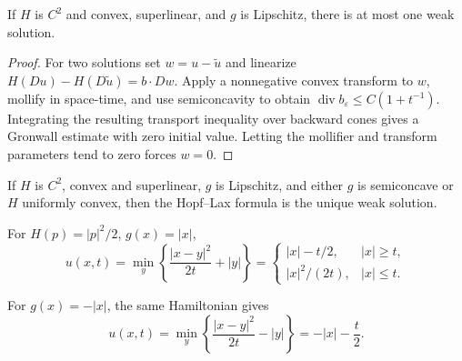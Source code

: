 \begin{theorem}
\label{thm:uniqueness-weak-solutions-hj}

If $H$ is $C^2$ and convex, superlinear, and $g$ is Lipschitz, there is at
most one weak solution.
\end{theorem}

\begin{proof}
\sketch For two solutions set $w=u-\tilde u$ and linearize
$H(Du)-H(D\tilde u)=b\cdot Dw$. Apply a nonnegative convex transform to $w$,
mollify in space-time, and use semiconcavity to obtain
$\operatorname{div}b_\varepsilon\le C(1+t^{-1})$. Integrating the resulting
transport inequality over backward cones gives a Gronwall estimate with zero
initial value. Letting the mollifier and transform parameters tend to zero
forces $w=0$.
\end{proof}

\begin{theorem}
\label{thm:hopf-lax-formula-weak-solution}

If $H$ is $C^2$, convex and superlinear, $g$ is Lipschitz, and either $g$ is
semiconcave or $H$ uniformly convex, then the Hopf--Lax formula is the unique
weak solution.
\end{theorem}

\begin{example}[Explicit Hopf--Lax solution: $H(p) = \frac{1}{2}|p|^2$, $g = |x|$]
\label{ex:hopf-lax-explicit-example-i}

For $H(p)=|p|^2/2$, $g(x)=|x|$,
\[
u(x,t)=\min_y\left\{\frac{|x-y|^2}{2t}+|y|\right\}
=\begin{cases}|x|-t/2,&|x|\ge t,\\|x|^2/(2t),&|x|\le t.\end{cases}
\]
\end{example}

\begin{example}[Explicit Hopf--Lax solution: $H(p) = \frac{1}{2}|p|^2$, $g = -|x|$]
\label{ex:hopf-lax-explicit-example-ii}

For $g(x)=-|x|$, the same Hamiltonian gives
\[
u(x,t)=\min_y\left\{\frac{|x-y|^2}{2t}-|y|\right\}=-|x|-\frac t2.
\]
\end{example}

